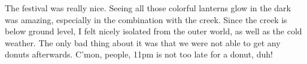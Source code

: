 \begin{post}
\begin{content}
\begin{figure}[h]
\centering
{}
\end{figure}

The festival was really nice. Seeing all those colorful lanterns glow in the dark was amazing, especially in the combination with the creek. Since the creek is below ground level, I felt nicely isolated from the outer world, as well as the cold weather. The only bad thing about it was that we were not able to get any donuts afterwards. C'mon, people, 11pm is not too late for a donut, duh!
	\end{content}
\end{post}
